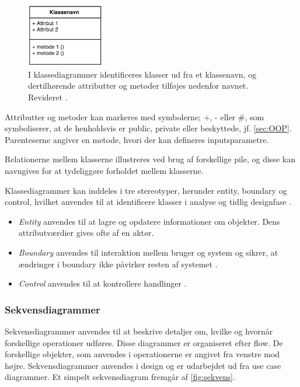 \begin{figure} [H]
\centering
\includegraphics[width=0.3\textwidth]{figures/klassediag}
\caption{I klassediagrammer identificeres klasser ud fra et klassenavn, og dertilhørende attributter og metoder tilføjes nedenfor navnet. Revideret \cite{Fowler2004}.}
\label{fig:klassediagram}
\end{figure}

\noindent
Attributter og metoder kan markeres med symbolerne; +, - eller \#, som symboliserer, at de henholdsvis er public, private eller beskyttede, jf. \autoref{sec:OOP}. Parenteserne angiver en metode, hvori der kan defineres inputsparametre.

Relationerne mellem klasserne illustreres ved brug af forskellige pile, og disse kan navngives for at tydeliggøre forholdet mellem  klasserne.

Klassediagrammer kan inddeles i tre stereotyper, herunder entity, boundary og control, hvilket anvendes til at identificere klasser i analyse og tidlig designfase \cite{RSC2002}.

\begin{itemize}
\item \textit{Entity} anvendes til at lagre og opdatere informationer om objekter. Dens attributværdier gives ofte af en aktør.\cite{RSC2002}
\item \textit{Boundary} anvendes til interaktion mellem bruger og system og sikrer, at ændringer i boundary ikke påvirker resten af systemet \cite{RSC2002}.
\item \textit{Control} anvendes til at kontrollere handlinger \cite{RSC2002}. 
\end{itemize}

\subsubsection{Sekvensdiagrammer}
Sekvensdiagrammer anvendes til at beskrive detaljer om, hvilke og hvornår forskellige operationer udføres. Disse diagrammer er organiseret efter flow. De forskellige objekter, som anvendes i operationerne er angivet fra venstre mod højre. Sekvensdiagrammer anvendes i design og er udarbejdet ud fra use case diagrammer.\cite{Brahma2015} Et simpelt sekvensdiagram fremgår af \autoref{fig:sekvens}.

